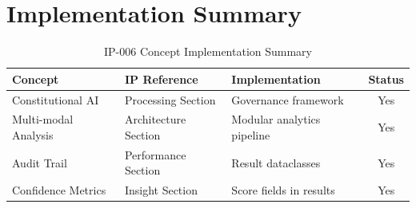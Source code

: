 \section{Implementation Summary}

\begin{table}[H]
\centering
\caption{IP-006 Concept Implementation Summary}
\begin{tabularx}{\textwidth}{@{}p{3cm}p{3.5cm}Xc@{}}
\toprule
\textbf{Concept} & \textbf{IP Reference} & \textbf{Implementation} & \textbf{Status} \\
\midrule
Constitutional AI & Processing Section & Governance framework & Yes \\
Multi-modal Analysis & Architecture Section & Modular analytics pipeline & Yes \\
Audit Trail & Performance Section & Result dataclasses & Yes \\
Confidence Metrics & Insight Section & Score fields in results & Yes \\
\bottomrule
\end{tabularx}
\end{table}